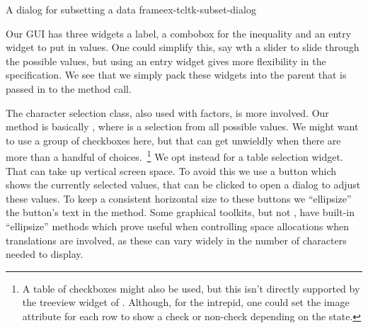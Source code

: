 \begin{example}{A dialog for subsetting a data frame}{ex-tcltk-subset-dialog}
\begin{Schunk}
\begin{Sinput}
\end{Sinput}
\end{Schunk}
%

Our GUI has three widgets a label, a combobox for the inequality
and an entry widget to put in values. One could simplify this, say
wth a slider to slide through the possible values, but using an
entry widget gives more flexibility in the specification. We see that
we simply pack these widgets into the parent that is passed in to the method call.
\begin{Schunk}
\end{Schunk}
%


The character selection class, also used with factors, is more
involved. Our  method is basically , where  is a selection from all possible
values.  We might want to use a group of checkboxes here, but that can
get unwieldly when there are more than a handful of
choices.~\footnote{A table of checkboxes might also be used, but this
  isn't directly supported by the treeview widget of
  . Although, for the intrepid, one could set the image
  attribute for each row to show a check or non-check depending on the
  state.} We opt instead for a table selection widget. That can take
up vertical screen space. To avoid this we use a button which shows
the currently selected values, that can be clicked to open a dialog to
adjust these values. To keep a consistent horizontal size to these
buttons we ``ellipsize'' the button's text in the 
method. Some graphical toolkits, but not \Tk, have built-in
``ellipsize'' methods which prove useful when controlling space
allocations when translations are involved, as these can vary widely
in the number of characters needed to display.


\end{example}
